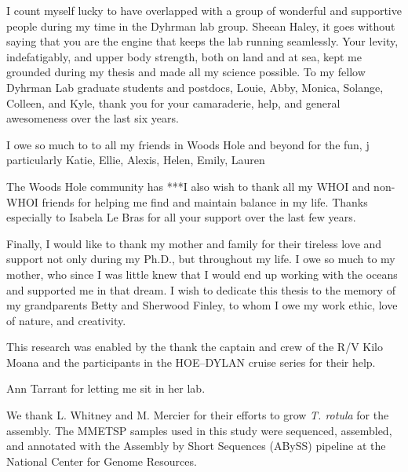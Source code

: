 {I count myself lucky to have overlapped with a group of wonderful and supportive people during my time in the Dyhrman lab group. Sheean Haley, it goes without saying that you are the engine that keeps the lab running seamlessly. Your levity, indefatigably, and upper body strength, both on land and at sea, kept me grounded during my thesis and made all my science possible. To my fellow Dyhrman Lab graduate students and postdocs, Louie, Abby, Monica, Solange, Colleen, and Kyle, thank you for your camaraderie, help, and general awesomeness over the last six years. \par
I owe so much to to all my friends in Woods Hole and beyond for the fun, j particularly Katie, Ellie, Alexis, Helen, Emily, Lauren

The Woods Hole community has  ***I also wish to thank all my WHOI and non-WHOI friends for helping me find and maintain balance in my life. Thanks especially to Isabela Le Bras for all your support over the last few years.\par 
Finally, I would like to thank my mother and family for their tireless love and support not only during my Ph.D., but throughout my life. I owe so much to my mother, who since I was little knew that I would end up working with the oceans and supported me in that dream. I wish to dedicate this thesis to the memory of my grandparents Betty and Sherwood Finley, to whom I owe my work ethic, love of nature, and creativity.\par 

This research was enabled by the thank the captain and crew of the R/V Kilo Moana and the participants in the HOE–DYLAN cruise series for their help. 


Ann Tarrant for letting me sit in her lab. 


We thank L. Whitney and M. Mercier for their efforts to grow \textit{T. rotula} for the assembly. The MMETSP samples used in this study were sequenced, assembled, and annotated with the Assembly by Short Sequences (ABySS) pipeline at the National Center for Genome Resources. 








}
    
